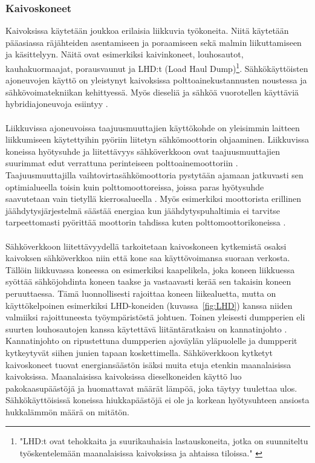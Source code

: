 \documentclass[finnish,12pt,a4paper,pdftex,elec,utf8]{aaltothesis}
\begin{document}
\subsubsection{Kaivoskoneet}
Kaivoksissa käytetään joukkoa erilaisia liikkuvia työkoneita. Niitä käytetään pääasiassa räjähteiden asentamiseen ja poraamiseen sekä malmin liikuttamiseen ja käsittelyyn. Näitä ovat esimerkiksi kaivinkoneet, louhosautot, kauhakuormaajat, porausvaunut ja LHD:t (Load Haul Dump)\footnote{"LHD:t ovat tehokkaita ja suurikauhaisia lastauskoneita, jotka on suunniteltu työskentelemään maanalaisissa kaivoksissa ja ahtaissa tiloissa." \cite[s. 192]{Hakapää}}. Sähkökäyttöisten ajoneuvojen käyttö on yleistynyt kaivoksissa polttoainekustannusten noustessa ja sähkövoimatekniikan kehittyessä. Myös dieseliä ja sähköä vuorotellen käyttäviä hybridiajoneuvoja esiintyy \cite{Brown}.
\\\\
Liikkuvissa ajoneuvoissa taajuusmuuttajien käyttökohde on yleisimmin laitteen liikkumiseen käytettyihin pyöriin liitetyn sähkömoottorin ohjaaminen. Liikkuvissa koneissa hyötysuhde ja liitettävyys sähköverkkoon ovat taajuusmuuttajien suurimmat edut verrattuna perinteiseen polttoainemoottoriin \cite{Brown}. Taajuusmuuttajilla vaihtovirtasähkömoottoria pystytään ajamaan jatkuvasti sen optimialueella toisin kuin polttomoottoreissa, joissa paras hyötysuhde saavutetaan vain tietyllä kierrosalueella \cite{Brown}. Myös esimerkiksi moottorista erillinen jäähdytysjärjestelmä säästää energiaa kun jäähdytyspuhaltimia ei tarvitse tarpeettomasti pyörittää moottorin tahdissa kuten polttomoottorikoneissa \cite{Brown}. 
\\\\
Sähköverkkoon liitettävyydellä tarkoitetaan kaivoskoneen kytkemistä osaksi kaivoksen sähköverkkoa niin että kone saa käyttövoimansa suoraan verkosta. Tällöin liikkuvassa koneessa on  esimerkiksi kaapelikela, joka koneen liikkuessa syöttää sähköjohdinta koneen taakse ja vastaavasti kerää sen takaisin koneen peruuttaessa. Tämä luonnollisesti rajoittaa koneen liikealuetta, mutta on käyttökelpoinen esimerkiksi LHD-koneiden (kuvassa~\ref{fig:LHD}) kanssa niiden valmiiksi rajoittuneesta työympäristöstä johtuen. Toinen yleisesti dumpperien eli suurten louhosautojen kanssa käytettävä liitäntäratkaisu on kannatinjohto \cite{Brown}. Kannatinjohto on ripustettuna dumpperien ajoväylän yläpuolelle ja dumpperit kytkeytyvät siihen junien tapaan koskettimella. Sähköverkkoon kytketyt kaivoskoneet tuovat energiansäästön isäksi muita etuja etenkin maanalaisissa kaivoksissa. Maanalaisissa kaivoksissa dieselkoneiden käyttö luo pakokaasupäästöjä ja huomattavat määrät lämpöä, joka täytyy tuulettaa ulos. Sähkökäyttöisissä koneissa hiukkapäästöjä ei ole ja korkean hyötysuhteen ansiosta hukkalämmön määrä on mitätön.
\end{document}

